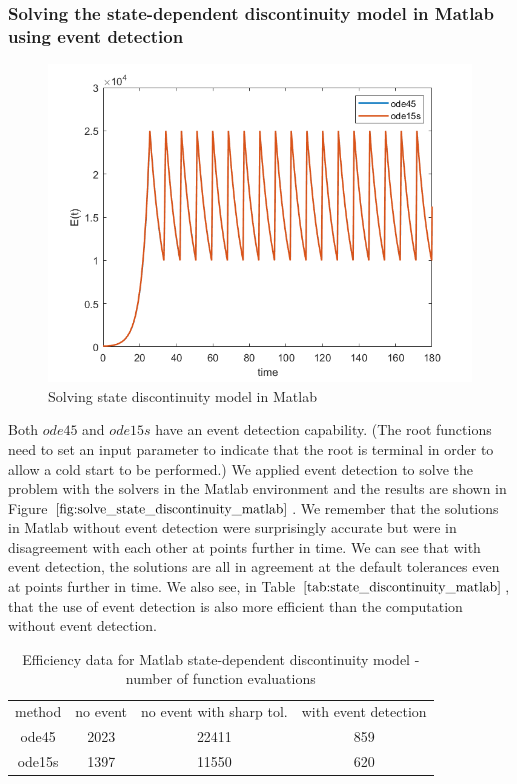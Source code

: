 \subsubsection{Solving the state-dependent discontinuity model in Matlab using event detection}
\begin{figure}[H]
\centering
\includegraphics[width=0.7\linewidth]{./figures/solve_state_discontinuity_matlab}
\caption{Solving state discontinuity model in Matlab}
\label{fig:solve_state_discontinuity_matlab}
\end{figure}
Both $ode45$ and $ode15s$ have an event detection capability. (The root functions need to set an input parameter to indicate that the root is terminal in order to allow a cold start to be performed.) We applied event detection to solve the problem with the solvers in the Matlab environment and the results are shown in Figure $\ref{fig:solve_state_discontinuity_matlab}$. We remember that the solutions in Matlab without event detection were surprisingly accurate but were in disagreement with each other at points further in time. We can see that with event detection, the solutions are all in agreement at the default tolerances even at points further in time. We also see, in Table $\ref{tab:state_discontinuity_matlab}$, that the use of event detection is also more efficient than the computation without event detection.

\begin{table}[h]
\caption {Efficiency data for Matlab state-dependent discontinuity model - number of function evaluations} \label{tab:state_discontinuity_matlab}
\begin{center}
\begin{tabular}{ c c c c } 
method & no event & no event with sharp tol. & with event detection \\ 
ode45 & 2023 & 22411 & 859 \\
ode15s & 1397 & 11550 & 620 \\
\end{tabular}
\end{center}
\end{table}

